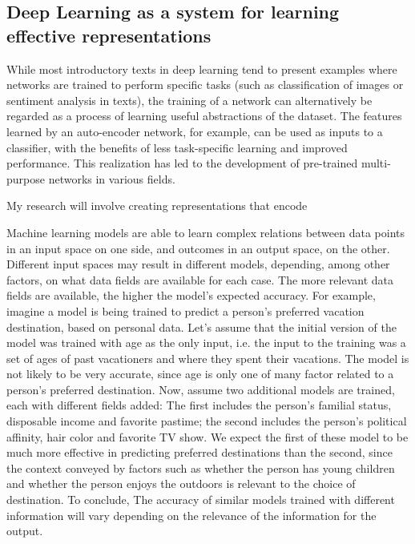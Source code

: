\documentclass[a4paper, 11pt]{article}      %
\begin{document}
\subsection{Deep Learning as a system for learning effective representations }
While most introductory texts in deep learning tend to present examples where networks are trained to perform specific tasks (such as classification of images or sentiment analysis in texts), the training of a network can alternatively be regarded as a process of learning useful abstractions of the dataset. The features learned by an auto-encoder network, for example, can be used as inputs to a classifier, with the benefits of less task-specific learning and improved performance. This realization has led to the development of pre-trained multi-purpose networks in various fields.

My research will involve creating representations that encode 


Machine learning models are able to learn complex relations between data points in an input space on one side, and outcomes in an output space, on the other. Different input spaces may result in different models, depending, among other factors, on what data fields are available for each case. The more relevant data fields are available, the higher the model's expected accuracy. For example, imagine a model is being trained to predict a person's preferred vacation destination, based on personal data. Let's assume that the initial version of the model was trained with age as the only input, i.e. the input to the training was a set of ages of past vacationers and where they spent their vacations. The model is not likely to be very accurate, since age is only one of many factor related to a person's preferred destination. Now, assume two additional models are trained, each with different fields added: The first includes the person's familial status, disposable income and favorite pastime; the second includes the person's political affinity, hair color and favorite TV show. We expect the first of these model to be much more effective in predicting preferred destinations than the second, since the context conveyed by factors such as whether the person has young children and whether the person enjoys the outdoors is relevant to the choice of destination. To conclude, The accuracy of similar models trained with different information will vary depending on the relevance of the information for the output.
\end{document}
